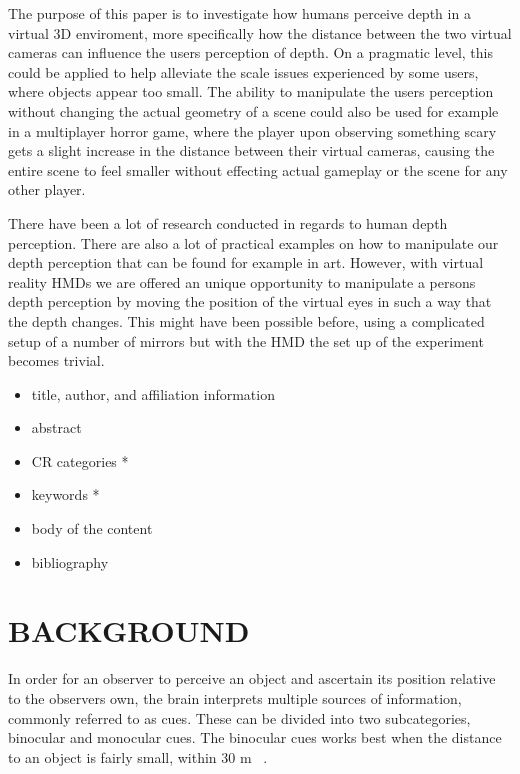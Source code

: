 \documentclass[tog]{acmsiggraph}
\begin{document}
The purpose of this paper is to investigate how humans perceive depth in a virtual 3D enviroment, more specifically how the distance between the two virtual cameras can influence the users perception of depth. On a pragmatic level, this could be applied to help alleviate the scale issues experienced by some users, where objects appear too small. The ability to manipulate the users perception without changing the actual geometry of a scene could also be used for example in a multiplayer horror game, where the player upon observing something scary gets a slight increase in the distance between their virtual cameras, causing the entire scene to feel smaller without effecting actual gameplay or the scene for any other player.    

There have been a lot of research conducted in regards to human depth perception. There are also a lot of practical examples on how to manipulate our depth perception that can be found for example in art. However, with virtual reality HMDs we are offered an unique opportunity to manipulate a persons depth perception by moving the position of the virtual eyes in such a way that the depth changes. This might have been possible before, using a complicated setup of a number of mirrors but with the HMD the set up of the experiment becomes trivial.  


\begin{itemize}
\item title, author, and affiliation information
\item abstract
\item CR categories *
\item keywords *
\item body of the content
\item bibliography
\end{itemize}



\section{BACKGROUND}

In order for an observer to perceive an object and ascertain its position relative to the observers own, the brain interprets multiple sources of information, commonly referred to as cues. 
These can be divided into two subcategories, binocular and monocular cues. The binocular cues works best when the distance to an object is fairly small, within 30 m ~\cite {Palvqvist:2013:DPDS}.
\end{document}
